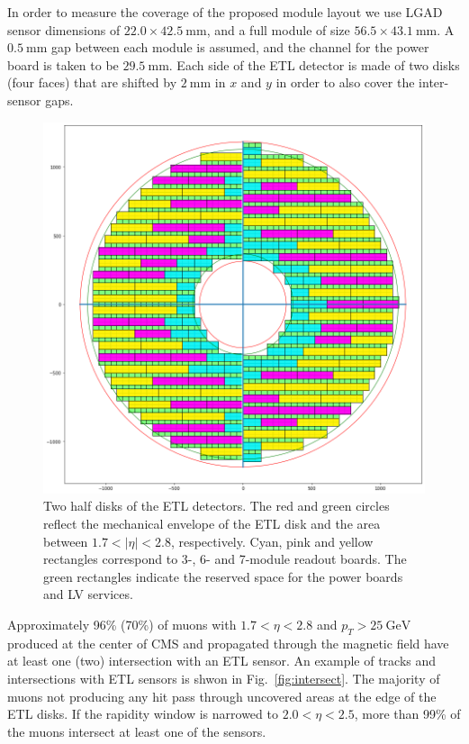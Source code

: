 \documentclass[11pt]{article}
\begin{document}
In order to measure the coverage of the proposed module layout we use LGAD sensor dimensions of $22.0 \times 42.5~\mathrm{mm}$, and a full module of size $56.5 \times 43.1~\mathrm{mm}$.
A $0.5~\mathrm{mm}$ gap between each module is assumed, and the channel for the power board is taken to be $29.5~\mathrm{mm}$.
Each side of the ETL detector is made of two disks (four faces) that are shifted by $2~\mathrm{mm}$ in $x$ and $y$ in order to also cover the inter-sensor gaps.

\begin{figure}[!h]
\centering
\includegraphics[width=0.60 \textwidth]{figures/coverage_both.png}
\caption{
Two half disks of the ETL detectors.
The red and green circles reflect the mechanical envelope of the ETL disk and the area between $1.7<|\eta|<2.8$, respectively.
Cyan, pink and yellow rectangles correspond to 3-, 6- and 7-module readout boards.
The green rectangles indicate the reserved space for the power boards and LV services.
}
\label{fig:coverage_both}
\end{figure}

Approximately 96\% (70\%) of muons with $1.7<\eta<2.8$ and $p_{T}>25~\mathrm{GeV}$ produced at the center of CMS and propagated through the magnetic field have at least one (two) intersection with an ETL sensor.
An example of tracks and intersections with ETL sensors is shwon in Fig.~\ref{fig:intersect}.
The majority of muons not producing any hit pass through uncovered areas at the edge of the ETL disks.
If the rapidity window is narrowed to $2.0<\eta<2.5$, more than 99\% of the muons intersect at least one of the sensors.
\end{document}
